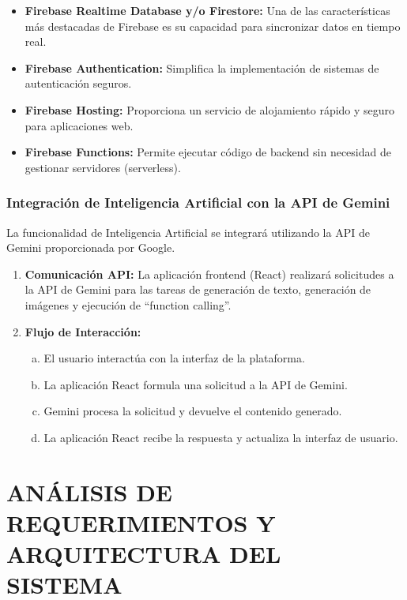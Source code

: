 \documentclass[12pt,a4paper]{report}
\begin{document}
\begin{itemize}
\item \textbf{Firebase Realtime Database y/o Firestore:} Una de las características más destacadas de Firebase es su capacidad para sincronizar datos en tiempo real.

\item \textbf{Firebase Authentication:} Simplifica la implementación de sistemas de autenticación seguros.

\item \textbf{Firebase Hosting:} Proporciona un servicio de alojamiento rápido y seguro para aplicaciones web.

\item \textbf{Firebase Functions:} Permite ejecutar código de backend sin necesidad de gestionar servidores (serverless).
\end{itemize}

\subsection{Integración de Inteligencia Artificial con la API de Gemini}

La funcionalidad de Inteligencia Artificial se integrará utilizando la API de Gemini proporcionada por Google.

\begin{enumerate}
\item \textbf{Comunicación API:} La aplicación frontend (React) realizará solicitudes a la API de Gemini para las tareas de generación de texto, generación de imágenes y ejecución de ``function calling''.

\item \textbf{Flujo de Interacción:}
\begin{enumerate}[a.]
\item El usuario interactúa con la interfaz de la plataforma.
\item La aplicación React formula una solicitud a la API de Gemini.
\item Gemini procesa la solicitud y devuelve el contenido generado.
\item La aplicación React recibe la respuesta y actualiza la interfaz de usuario.
\end{enumerate}
\end{enumerate}

\chapter{ANÁLISIS DE REQUERIMIENTOS Y ARQUITECTURA DEL SISTEMA}
\end{document}
